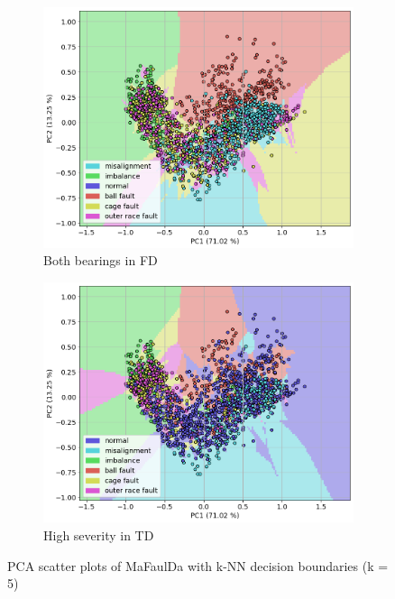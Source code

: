 \documentclass{llncs}
\begin{document}
\begin{figure}
\begin{subfigure}[b]{0.45\textwidth}
         \centering
         \includegraphics[width=\textwidth]{fig/scatter-mafaulda/fd-all-bearings.png}
         \caption{Both bearings in FD}
     \end{subfigure}
     \hfill
     \begin{subfigure}[b]{0.45\textwidth}
         \centering
         \includegraphics[width=\textwidth]{fig/scatter-mafaulda/fd-severity.png}
         \caption{High severity in TD}
     \end{subfigure}
     \caption{PCA scatter plots of MaFaulDa with k-NN decision boundaries (k = 5)}
\end{figure}
\end{document}
